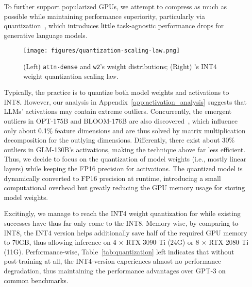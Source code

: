 To further support popularized GPUs,
we attempt to compress \glm as much as possible while maintaining performance superiority, particularly via  quantization~\citep{zafrir2019q8bert,shen2020q,tao2022compression}, which introduces little task-agnostic performance drops for generative language models. 

\begin{wrapfigure}{r}{6cm}
    \small
    \vspace{-6mm}
    \centering
    \texttt{[image: figures/quantization-scaling-law.png]}
    \vspace{-4mm}
    \caption{(Left) \texttt{attn-dense} and \texttt{w2}'s weight distributions; (Right) \glm's INT4 weight quantization scaling law.}
    \label{fig:scaling_law}
    \vspace{-5mm}
\end{wrapfigure}

Typically, the practice is to quantize both model weights and activations to INT8.
However, our analysis in Appendix~\ref{app:activation_analysis} suggests that LLMs' activations may contain extreme outliers. 
Concurrently, the emergent outliers in OPT-175B and BLOOM-176B are also discovered~\citep{dettmers2022llm}, which influence only about 0.1\% feature dimensions and are thus solved by matrix multiplication decomposition for the outlying dimensions.
Differently, there exist about 30\% outliers in GLM-130B's activations, making the technique above far less efficient. %
Thus, we decide to focus on the quantization of model weights (i.e., mostly linear layers) while keeping the FP16 precision for activations.  
The quantized model is dynamically converted to FP16 precision at runtime, introducing a small computational overhead but greatly reducing the GPU memory usage for storing model weights. 

Excitingly, we manage to reach the INT4 weight quantization for \glm while existing successes have thus far only come to the INT8. 
Memory-wise, by comparing to INT8, the INT4 version helps additionally save half of the required GPU memory to 70GB, thus allowing \glm inference on 4 $\times$ RTX 3090 Ti (24G) or 8 $\times$ RTX 2080 Ti (11G). 
Performance-wise, Table~\ref{tab:quantization} left indicates that without post-training at all, the INT4-version \glm experiences almost no performance degradation, thus maintaining the performance advantages over GPT-3 on common benchmarks. 


